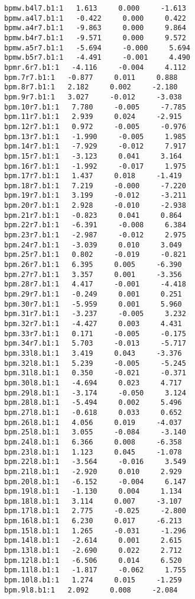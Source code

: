 \begin{verbatim}
bpmw.b4l7.b1:1   1.613     0.000     -1.613
bpmw.a4l7.b1:1   -0.422     0.000     0.422
bpmw.a4r7.b1:1   -9.863     0.000     9.864
bpmw.b4r7.b1:1   -9.571     0.000     9.572
bpmw.a5r7.b1:1   -5.694     -0.000     5.694
bpmw.b5r7.b1:1   -4.491     -0.001     4.490
bpmr.6r7.b1:1   -4.116     -0.004     4.112
bpm.7r7.b1:1   -0.877     0.011     0.888
bpm.8r7.b1:1   2.182     0.002     -2.180
bpm.9r7.b1:1   3.027     -0.012     -3.038
bpm.10r7.b1:1   7.780     -0.005     -7.785
bpm.11r7.b1:1   2.939     0.024     -2.915
bpm.12r7.b1:1   0.972     -0.005     -0.976
bpm.13r7.b1:1   -1.990     -0.005     1.985
bpm.14r7.b1:1   -7.929     -0.012     7.917
bpm.15r7.b1:1   -3.123     0.041     3.164
bpm.16r7.b1:1   -1.992     -0.017     1.975
bpm.17r7.b1:1   1.437     0.018     -1.419
bpm.18r7.b1:1   7.219     -0.000     -7.220
bpm.19r7.b1:1   3.199     -0.012     -3.211
bpm.20r7.b1:1   2.928     -0.010     -2.938
bpm.21r7.b1:1   -0.823     0.041     0.864
bpm.22r7.b1:1   -6.391     -0.008     6.384
bpm.23r7.b1:1   -2.987     -0.012     2.975
bpm.24r7.b1:1   -3.039     0.010     3.049
bpm.25r7.b1:1   0.802     -0.019     -0.821
bpm.26r7.b1:1   6.395     0.005     -6.390
bpm.27r7.b1:1   3.357     0.001     -3.356
bpm.28r7.b1:1   4.417     -0.001     -4.418
bpm.29r7.b1:1   -0.249     0.001     0.251
bpm.30r7.b1:1   -5.959     0.001     5.960
bpm.31r7.b1:1   -3.237     -0.005     3.232
bpm.32r7.b1:1   -4.427     0.003     4.431
bpm.33r7.b1:1   0.171     -0.005     -0.175
bpm.34r7.b1:1   5.703     -0.013     -5.717
bpm.33l8.b1:1   3.419     0.043     -3.376
bpm.32l8.b1:1   5.239     -0.005     -5.245
bpm.31l8.b1:1   0.350     -0.021     -0.371
bpm.30l8.b1:1   -4.694     0.023     4.717
bpm.29l8.b1:1   -3.174     -0.050     3.124
bpm.28l8.b1:1   -5.494     0.002     5.496
bpm.27l8.b1:1   -0.618     0.033     0.652
bpm.26l8.b1:1   4.056     0.019     -4.037
bpm.25l8.b1:1   3.055     -0.084     -3.140
bpm.24l8.b1:1   6.366     0.008     -6.358
bpm.23l8.b1:1   1.123     0.045     -1.078
bpm.22l8.b1:1   -3.564     -0.016     3.549
bpm.21l8.b1:1   -2.920     0.010     2.929
bpm.20l8.b1:1   -6.152     -0.004     6.147
bpm.19l8.b1:1   -1.130     0.004     1.134
bpm.18l8.b1:1   3.114     0.007     -3.107
bpm.17l8.b1:1   2.775     -0.025     -2.800
bpm.16l8.b1:1   6.230     0.017     -6.213
bpm.15l8.b1:1   1.265     -0.031     -1.296
bpm.14l8.b1:1   -2.614     0.001     2.615
bpm.13l8.b1:1   -2.690     0.022     2.712
bpm.12l8.b1:1   -6.506     0.014     6.520
bpm.11l8.b1:1   -1.817     -0.062     1.755
bpm.10l8.b1:1   1.274     0.015     -1.259
bpm.9l8.b1:1   2.092     0.008     -2.084

\end{verbatim}
